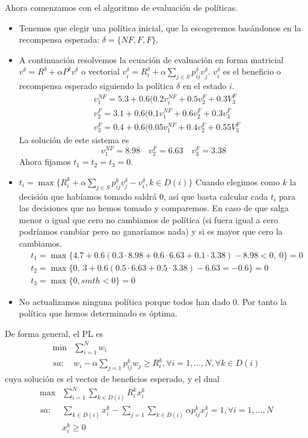 \documentclass[twoside]{article}
\begin{document}
\begin{ejercicio}{2}
\begin{solucion}
Ahora comenzamos con el algoritmo de evaluación de políticas. 
\begin{itemize}
\item Tenemos que elegir una política inicial, que la escogeremos basándonos en la recompensa esperada: $\delta=\{NF, F, F\}$.
\item  A continuación resolvemos la ecuación de evaluación en forma matricial $v^\delta=R^\delta+\alpha P^\delta v^\delta$ o vectorial $v^\delta_i=R^\delta_i+\alpha\sum_{j\in S}p_{ij}^\delta v_j^\delta$. $v_i^{\delta}$ es el beneficio o recompensa esperado siguiendo la política $\delta$ en el estado $i$.
\begin{align*}
&v^{NF}_1=5.3+0.6(0.2v_i^{NF}+0.5v_2^{F}+0.3V^F_3\\
&v_2^F=3.1+0.6(0.1v_1^{NF}+0.6v_2^F+0.3v_3^F\\
&v_3^F=0.4+0.6(0.05v_1^{NF}+0.4v_2^F+0.55V_3^F
\end{align*}
La solución de este sistema es
\[
v_1^{NF}=8.98\quad v_2^F=6.63\quad v_3^F=3.38
\]
Ahora fijamos $t_1=t_2=t_3=0$.
\item $t_i=\max\{R_i^k+\alpha\sum_{j\in S}p_{ij}^kv_j^\delta-v_i^\delta, k\in D(i)\}$
Cuando elegimos como $k$ la decisión que habíamos tomado saldrá 0, así que basta calcular cada $t_i$ para las decisiones que no hemos tomado y comparemos. En caso de que salga menor o igual que cero no cambiamos de política (si fuera igual a cero podríamos cambiar pero no ganaríamos nada) y si es mayor que cero la cambiamos.
\begin{align*}
&t_1=\max\{4.7+0.6(0.3\cdot 8.98+0.6\cdot 6.63+0.1\cdot 3.38)-8.98<0,\ 0\}=0 \\
&t_2=\max\{0,\ 3+0.6(0.5\cdot 6.63+0.5\cdot 3.38)-6.63=-0.6\}=0\\
&t_3=\max\{0, smth<0\}=0
\end{align*}
\item No actualizamos ninguna política porque todos han dado 0. Por tanto la política que hemos determinado es óptima.
\end{itemize}

De forma general, el PL es
\begin{align*}
\min & \sum_{i=1}^N w_i\\
sa:  & w_i-\alpha\sum_{j=1}p_{ij}^kw_j\geq R_i^k, \forall i=1,\dots, N,\forall k\in D(i)
\end{align*}
cuya solución es el vector de beneficios esperado, y el dual
\begin{align*}
\max & \sum_{i=1}^N\sum_{k\in D(i)}R^k_ix_i^k\\
sa: & \sum_{k\in D(i)}x_i^k-\sum_{j=1}\sum_{k\in D(i)}\alpha p_{ij}^kx_j^k=1, \forall i=1,\dots, N\\
    & x^k_i\geq 0
\end{align*}


\end{solucion}
\end{ejercicio}
\end{document}
